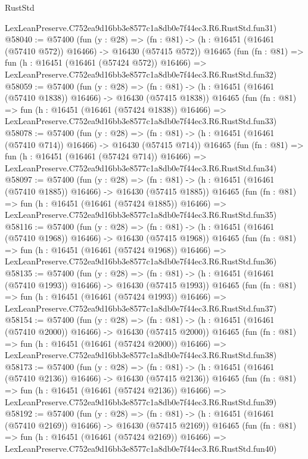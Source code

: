 \begin{lexlean}{RustStd}
\begin{coremodule}
    LexLeanPreserve.C752ea9d16bb3e8577c1a8db0e7f44ec3.R6.RustStd.fun31)
@58040 := @57400
    (fun (y : @28) =>
    (fn : @81) -> (h : @16451 (@16461 (@57410 @572)) @16466) -> @16430 (@57415 @572))
    @16465
    (fun (fn : @81) =>
    fun (h : @16451 (@16461 (@57424 @572)) @16466) =>
    LexLeanPreserve.C752ea9d16bb3e8577c1a8db0e7f44ec3.R6.RustStd.fun32)
@58059 := @57400
    (fun (y : @28) =>
    (fn : @81) -> (h : @16451 (@16461 (@57410 @1838)) @16466) -> @16430 (@57415 @1838))
    @16465
    (fun (fn : @81) =>
    fun (h : @16451 (@16461 (@57424 @1838)) @16466) =>
    LexLeanPreserve.C752ea9d16bb3e8577c1a8db0e7f44ec3.R6.RustStd.fun33)
@58078 := @57400
    (fun (y : @28) =>
    (fn : @81) -> (h : @16451 (@16461 (@57410 @714)) @16466) -> @16430 (@57415 @714))
    @16465
    (fun (fn : @81) =>
    fun (h : @16451 (@16461 (@57424 @714)) @16466) =>
    LexLeanPreserve.C752ea9d16bb3e8577c1a8db0e7f44ec3.R6.RustStd.fun34)
@58097 := @57400
    (fun (y : @28) =>
    (fn : @81) -> (h : @16451 (@16461 (@57410 @1885)) @16466) -> @16430 (@57415 @1885))
    @16465
    (fun (fn : @81) =>
    fun (h : @16451 (@16461 (@57424 @1885)) @16466) =>
    LexLeanPreserve.C752ea9d16bb3e8577c1a8db0e7f44ec3.R6.RustStd.fun35)
@58116 := @57400
    (fun (y : @28) =>
    (fn : @81) -> (h : @16451 (@16461 (@57410 @1968)) @16466) -> @16430 (@57415 @1968))
    @16465
    (fun (fn : @81) =>
    fun (h : @16451 (@16461 (@57424 @1968)) @16466) =>
    LexLeanPreserve.C752ea9d16bb3e8577c1a8db0e7f44ec3.R6.RustStd.fun36)
@58135 := @57400
    (fun (y : @28) =>
    (fn : @81) -> (h : @16451 (@16461 (@57410 @1993)) @16466) -> @16430 (@57415 @1993))
    @16465
    (fun (fn : @81) =>
    fun (h : @16451 (@16461 (@57424 @1993)) @16466) =>
    LexLeanPreserve.C752ea9d16bb3e8577c1a8db0e7f44ec3.R6.RustStd.fun37)
@58154 := @57400
    (fun (y : @28) =>
    (fn : @81) -> (h : @16451 (@16461 (@57410 @2000)) @16466) -> @16430 (@57415 @2000))
    @16465
    (fun (fn : @81) =>
    fun (h : @16451 (@16461 (@57424 @2000)) @16466) =>
    LexLeanPreserve.C752ea9d16bb3e8577c1a8db0e7f44ec3.R6.RustStd.fun38)
@58173 := @57400
    (fun (y : @28) =>
    (fn : @81) -> (h : @16451 (@16461 (@57410 @2136)) @16466) -> @16430 (@57415 @2136))
    @16465
    (fun (fn : @81) =>
    fun (h : @16451 (@16461 (@57424 @2136)) @16466) =>
    LexLeanPreserve.C752ea9d16bb3e8577c1a8db0e7f44ec3.R6.RustStd.fun39)
@58192 := @57400
    (fun (y : @28) =>
    (fn : @81) -> (h : @16451 (@16461 (@57410 @2169)) @16466) -> @16430 (@57415 @2169))
    @16465
    (fun (fn : @81) =>
    fun (h : @16451 (@16461 (@57424 @2169)) @16466) =>
    LexLeanPreserve.C752ea9d16bb3e8577c1a8db0e7f44ec3.R6.RustStd.fun40)

\end{coremodule}
\end{lexlean}
